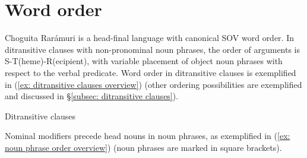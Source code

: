 \section{Word order}
\label{sec: word order}

Choguita Rarámuri is a head-final language with canonical SOV word order. In ditransitive clauses with non-pronominal noun phrases, the order
of arguments is S-T(heme)-R(ecipient), with variable placement of object noun phrases with respect to the verbal predicate. Word order in ditransitive clauses is exemplified in (\ref{ex: ditransitive clauses overview}) (other ordering possibilities are exemplified and discussed in §\ref{subsec: ditransitive clauses}).

\ea\label{ex: ditransitive clauses overview}
{Ditransitive clauses}\\

    \z
\z

Nominal modifiers precede head nouns in noun phrases, as exemplified in (\ref{ex: noun phrase order overview}) (noun phrases are marked in square brackets).

\ea\label{ex: noun phrase order overview}

